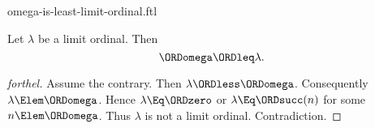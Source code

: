 \documentclass{stex}
\begin{document}
\begin{smodule}{omega-is-least-limit-ordinal.ftl}

\begin{proposition}[forthel]
  Let $\lambda$ be a limit ordinal.
  Then \[ \ORDomega \ORDleq \lambda. \]
\end{proposition}
\begin{proof}[forthel]
  Assume the contrary.
  Then $\lambda \ORDless \ORDomega$.
  Consequently $\lambda \Elem \ORDomega$.
  Hence $\lambda \Eq \ORDzero$ or $\lambda \Eq \ORDsucc(n)$ for some $n \Elem \ORDomega$.
  Thus $\lambda$ is not a limit ordinal.
  Contradiction.
\end{proof}
\end{smodule}
\end{document}
